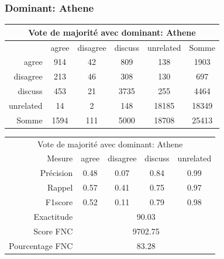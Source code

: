 \documentclass[11pt,a4paper,oldfontcommands]{memoir}
\begin{document}
\subsubsection{Dominant: Athene}

\begin{center}
 \begin{tabular}{ r | c c c c | c }
  \multicolumn{6}{c}{Vote de majorité avec dominant: Athene} \\
  \hline
            & agree & disagree & discuss & unrelated & Somme \\
  \hline
  agree     & 914   & 42       & 809     & 138       & 1903  \\
  disagree  & 213   & 46       & 308     & 130       & 697   \\
  discuss   & 453   & 21       & 3735    & 255       & 4464  \\
  unrelated & 14    & 2        & 148     & 18185     & 18349 \\
  \hline
  Somme     & 1594  & 111      & 5000    & 18708     & 25413 \\
 \end{tabular}
\end{center}



\begin{center}
 \begin{tabular}{ r | c c c c }
  \multicolumn{5}{c}{Vote de majorité avec dominant: Athene}                     \\
  Mesure          & agree                       & disagree & discuss & unrelated \\
  \hline
  Précision       & 0.48                        & 0.07     & 0.84    & 0.99      \\
  Rappel          & 0.57                        & 0.41     & 0.75    & 0.97      \\
  F1score         & 0.52                        & 0.11     & 0.79    & 0.98      \\
  \hline
  \hline
  Exactitude      & \multicolumn{4}{c}{90.03}                                    \\
  Score FNC       & \multicolumn{4}{c}{9702.75}                                  \\
  Pourcentage FNC & \multicolumn{4}{c}{83.28}                                    \\
 \end{tabular}
\end{center}
\end{document}
